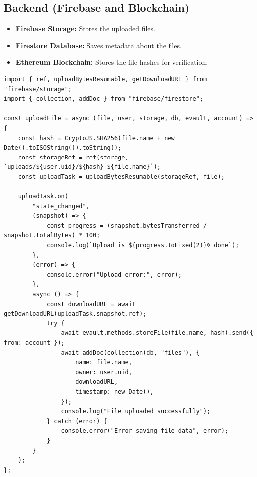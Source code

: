 \documentclass[12pt,a4paper]{report}
\begin{document}
\subsection{Backend (Firebase and Blockchain)}
\begin{itemize}
   \item \textbf{Firebase Storage:} Stores the uploaded files.
   \item \textbf{Firestore Database:} Saves metadata about the files.
   \item \textbf{Ethereum Blockchain:} Stores the file hashes for verification.
\end{itemize}
\begin{lstlisting}[caption=Backend Code Snippet]
   import { ref, uploadBytesResumable, getDownloadURL } from "firebase/storage";
import { collection, addDoc } from "firebase/firestore";

const uploadFile = async (file, user, storage, db, evault, account) => {
    const hash = CryptoJS.SHA256(file.name + new Date().toISOString()).toString();
    const storageRef = ref(storage, `uploads/${user.uid}/${hash}_${file.name}`);
    const uploadTask = uploadBytesResumable(storageRef, file);

    uploadTask.on(
        "state_changed",
        (snapshot) => {
            const progress = (snapshot.bytesTransferred / snapshot.totalBytes) * 100;
            console.log(`Upload is ${progress.toFixed(2)}% done`);
        },
        (error) => {
            console.error("Upload error:", error);
        },
        async () => {
            const downloadURL = await getDownloadURL(uploadTask.snapshot.ref);
            try {
                await evault.methods.storeFile(file.name, hash).send({ from: account });
                await addDoc(collection(db, "files"), {
                    name: file.name,
                    owner: user.uid,
                    downloadURL,
                    timestamp: new Date(),
                });
                console.log("File uploaded successfully");
            } catch (error) {
                console.error("Error saving file data", error);
            }
        }
    );
};

   \end{lstlisting}
\end{document}
